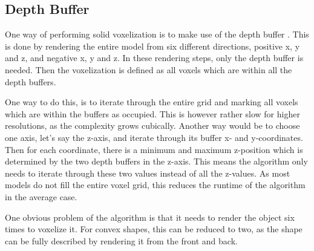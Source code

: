 
\newpage

\subsection{Depth Buffer}
One way of performing solid voxelization is to make use of the depth buffer \cite{depth-buffer}.
This is done by rendering the entire model from six different directions, positive x, y and z, and negative x, y and z.
In these rendering steps, only the depth buffer is needed.
Then the voxelization is defined as all voxels which are within all the depth buffers. 

One way to do this, is to iterate through the entire grid and marking all voxels which are within the buffers as occupied.
This is however rather slow for higher resolutions, as the complexity grows cubically.
Another way would be to choose one axis, let's say the z-axis, and iterate through its buffer x- and y-coordinates.
Then for each coordinate, there is a minimum and maximum z-position which is determined by the two depth buffers in the z-axis.
This means the algorithm only needs to iterate through these two values instead of all the z-values.
As most models do not fill the entire voxel grid, this reduces the runtime of the algorithm in the average case.

One obvious problem of the algorithm is that it needs to render the object six times to voxelize it.
For convex shapes, this can be reduced to two, as the shape can be fully described by rendering it from the front and back. 

